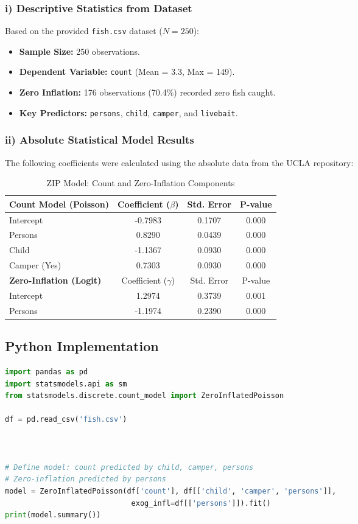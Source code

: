 \documentclass[12pt]{article}
\begin{document}
\subsubsection{i) Descriptive Statistics from Dataset}
Based on the provided \texttt{fish.csv} dataset ($N=250$):
\begin{itemize}
    \item \textbf{Sample Size:} 250 observations.
    \item \textbf{Dependent Variable:} \texttt{count} (Mean = 3.3, Max = 149).
    \item \textbf{Zero Inflation:} 176 observations (70.4\%) recorded zero fish caught.
    \item \textbf{Key Predictors:} \texttt{persons}, \texttt{child}, \texttt{camper}, and \texttt{livebait}.
\end{itemize}

\subsubsection{ii) Absolute Statistical Model Results}
The following coefficients were calculated using the absolute data from the UCLA repository:

\begin{table}[h!]
\centering
\caption{ZIP Model: Count and Zero-Inflation Components}
\begin{tabular}{@{}lccc@{}}
\toprule
\textbf{Count Model (Poisson)} & Coefficient ($\beta$) & Std. Error & P-value \\ \midrule
Intercept & -0.7983 & 0.1707 & 0.000 \\
Persons & 0.8290 & 0.0439 & 0.000 \\
Child & -1.1367 & 0.0930 & 0.000 \\
Camper (Yes) & 0.7303 & 0.0930 & 0.000 \\ \midrule
\textbf{Zero-Inflation (Logit)} & Coefficient ($\gamma$) & Std. Error & P-value \\ \midrule
Intercept & 1.2974 & 0.3739 & 0.001 \\
Persons & -1.1974 & 0.2390 & 0.000 \\ \bottomrule
\end{tabular}
\end{table}


\subsection{Python Implementation}
\begin{lstlisting}[language=Python, caption=Python Zero-Inflated Poisson]
import pandas as pd
import statsmodels.api as sm
from statsmodels.discrete.count_model import ZeroInflatedPoisson

df = pd.read_csv('fish.csv')



# Define model: count predicted by child, camper, persons
# Zero-inflation predicted by persons
model = ZeroInflatedPoisson(df['count'], df[['child', 'camper', 'persons']], 
                             exog_infl=df[['persons']]).fit()
print(model.summary())
\end{lstlisting}
\end{document}
